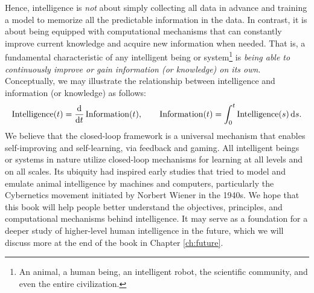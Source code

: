 \documentclass[\toplevelprefix/book-main.tex]{subfiles}
\begin{document}
Hence, intelligence is {\em not} about simply collecting all data in advance and training a model to memorize all the predictable information in the data. In contrast, it is about being equipped with computational mechanisms that can constantly improve current knowledge and acquire new information when needed. That is, a fundamental characteristic of any intelligent being or system\footnote{An animal, a human being, an intelligent robot, the scientific community, and even the entire civilization.} is {\em being able to continuously improve or gain information (or knowledge) on its own}. Conceptually, we may illustrate the relationship between intelligence and information (or knowledge) as follows:
\begin{equation}
\operatorname{Intelligence}(t) = \odv*{\operatorname{Information}}{t}(t), \qquad 
\operatorname{Information}(t)  = \int_0^t \operatorname{Intelligence}(s) \odif{s}.
\end{equation}
We believe that the closed-loop framework is a universal mechanism that enables self-improving and self-learning, via feedback and gaming. All intelligent beings or systems in nature utilize closed-loop mechanisms for learning at all levels and on all scales. Its ubiquity had inspired early studies that tried to model and emulate animal intelligence by machines and computers, particularly the Cybernetics movement initiated by Norbert Wiener in the 1940s. We hope that this book will help people better understand the objectives, principles, and computational mechanisms behind intelligence. It may serve as a foundation for a deeper study of higher-level human intelligence in the future, which we will discuss more at the end of the book in Chapter \ref{ch:future}.
\end{document}
